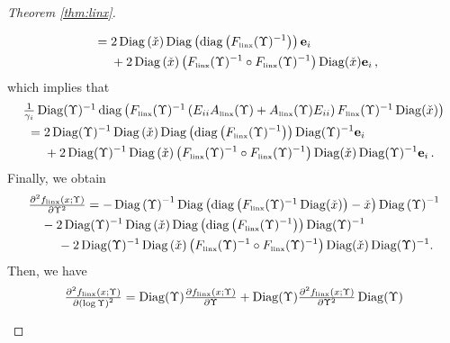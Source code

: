 \documentclass[smallextended]{svjour3hack}       %
\DeclareMathOperator{\Diag}{Diag}
\DeclareMathOperator{\diag}{diag}
\begin{document}
\begin{proof}[Theorem \ref{thm:linx}]
\begin{itemize}
\begin{align*}
     &~= 2 \Diag\left(\check{x}\right) \Diag\left(\diag\left(F_{{\tiny\mbox{linx}}}(\Upsilon)^{-1}\right)\right) \mathbf{e}_i\\
     &~~ \quad + 2 \Diag\left(\check{x}\right)   \left(F_{{\tiny\mbox{linx}}}(\Upsilon)^{-1}\circ F_{{\tiny\mbox{linx}}}(\Upsilon)^{-1}\right) \Diag(\check{x}) \mathbf{e}_i\,,
 \end{align*}
    which implies that
    \begin{align*}
        &\textstyle\frac{1}{\gamma_i}\Diag(\Upsilon)^{-1}\diag\left(F_{{\tiny\mbox{linx}}}(\Upsilon)^{-1}\left(E_{ii}A_{{\tiny\mbox{linx}}}(\Upsilon)+A_{{\tiny\mbox{linx}}}(\Upsilon) E_{ii}\right)
    F_{{\tiny\mbox{linx}}}(\Upsilon)^{-1}\Diag(\check{x})\right)\\
    & ~=2 \Diag(\Upsilon)^{-1} \Diag\left(\check{x}\right) \Diag\left(\diag\left(F_{{\tiny\mbox{linx}}}(\Upsilon)^{-1}\right)\right) \Diag(\Upsilon)^{-1}\mathbf{e}_i \\
    & ~~\quad  +2 \Diag(\Upsilon)^{-1} \Diag\left(\check{x}\right)   \left(F_{{\tiny\mbox{linx}}}(\Upsilon)^{-1}\circ F_{{\tiny\mbox{linx}}}(\Upsilon)^{-1}\right) \Diag(\check{x})\Diag(\Upsilon)^{-1}\mathbf{e}_i\,.
    \end{align*}
    Finally, we obtain
    \begin{align*}
        &\textstyle\frac{\partial^2 f_{{\tiny\mbox{linx}}}\left(x;\Upsilon\right)}{\partial \Upsilon ^2 }
         =-  \Diag\left(\Upsilon\right)^{-1} \Diag\left(\diag\left(F_{{\tiny\mbox{linx}}}(\Upsilon)^{-1}\Diag(\check{x})\right)-\check{x}\right) \Diag\left(\Upsilon\right)^{-1}   \\
        & \quad - 2 \Diag(\Upsilon)^{-1} \Diag\left(\check{x}\right) \Diag\left(\diag\left(F_{{\tiny\mbox{linx}}}(\Upsilon)^{-1}\right)\right) \Diag(\Upsilon)^{-1} \\
        &~~~~\quad -2 \Diag(\Upsilon)^{-1} \Diag\left(\check{x}\right)   \left(F_{{\tiny\mbox{linx}}}(\Upsilon)^{-1}\circ F_{{\tiny\mbox{linx}}}(\Upsilon)^{-1}\right)  \Diag(\check{x}) \Diag(\Upsilon)^{-1}.
    \end{align*}
   Then, we have
    \begin{align*}
        &\textstyle\frac{\partial^2 f_{{\tiny\mbox{linx}}}\left(x;\Upsilon\right)}{\partial \left(\log \Upsilon\right) ^2} = \Diag(\Upsilon) \textstyle\frac{\partial f_{{\tiny\mbox{linx}}}\left(x;\Upsilon\right)}{\partial \Upsilon } + \Diag(\Upsilon)\frac{\partial^2 f_{{\tiny\mbox{linx}}}\left(x;\Upsilon\right)}{\partial \Upsilon ^2 } \Diag(\Upsilon)\\

\end{align*}
\end{itemize}
\end{proof}
\end{document}
